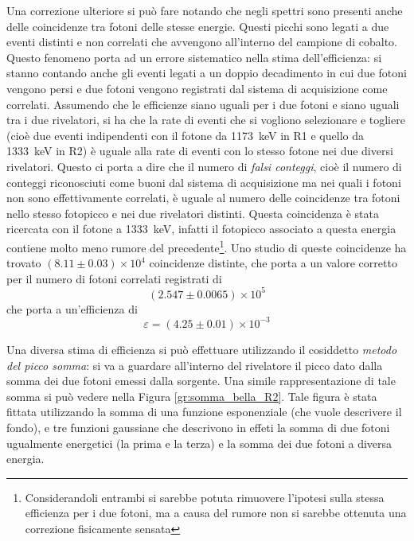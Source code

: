 Una correzione ulteriore si può fare notando che negli spettri sono presenti anche delle coincidenze tra fotoni delle stesse energie. Questi picchi sono legati a due eventi
distinti e non correlati che avvengono all'interno del campione di cobalto. Questo fenomeno porta ad un errore sistematico nella stima dell'efficienza: si stanno contando
anche gli eventi legati a un doppio decadimento in cui due fotoni vengono persi e due fotoni vengono registrati dal sistema di acquisizione come correlati. Assumendo che le
efficienze siano uguali per i due fotoni e siano uguali tra i due rivelatori, si ha che la rate di eventi che si vogliono selezionare e togliere (cioè due eventi indipendenti
con il fotone da 1173~keV in R1 e quello da 1333~keV in R2) è uguale alla rate di eventi con lo stesso fotone nei due diversi rivelatori. Questo ci porta a dire che il numero
di \textit{falsi conteggi}, cioè il numero di conteggi riconosciuti come buoni dal sistema di acquisizione ma nei quali i fotoni non sono effettivamente correlati, è uguale
al numero delle coincidenze tra fotoni nello stesso fotopicco e nei due rivelatori distinti. Questa coincidenza è stata ricercata con il fotone a 1333~keV, infatti il
fotopicco associato a questa energia contiene molto meno rumore del precedente\footnote{Considerandoli entrambi si sarebbe potuta rimuovere l'ipotesi sulla stessa efficienza
per i due fotoni, ma a causa del rumore non si sarebbe ottenuta una correzione fisicamente sensata}. Uno studio di queste coincidenze ha trovato $(8.11 \pm 0.03)\times 10^4$
coincidenze distinte, che porta a un valore corretto per il numero di fotoni correlati registrati di
$$(2.547 \pm 0.0065)\times 10^5$$
che porta a un'efficienza di
$$\varepsilon = (4.25 \pm 0.01)\times 10^{-3}$$

\FloatBarrier
Una diversa stima di efficienza si può effettuare utilizzando il cosiddetto \textit{metodo del picco somma}: si va a guardare all'interno del rivelatore il picco dato dalla 
somma dei due fotoni emessi dalla sorgente. Una simile rappresentazione di tale somma si può vedere nella Figura \ref{gr:somma_bella_R2}. Tale figura è stata fittata 
utilizzando la somma di una funzione esponenziale (che vuole descrivere il fondo), e tre funzioni gaussiane che descrivono in effeti la somma di due fotoni ugualmente energetici
(la prima e la terza) e la somma dei due fotoni a diversa energia.\\


